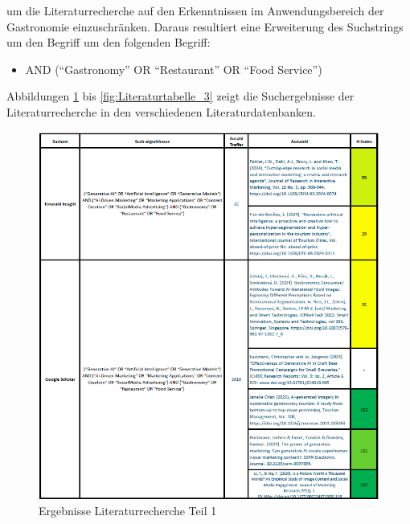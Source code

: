 um die Literaturrecherche auf den Erkenntnissen im Anwendungsbereich der Gastronomie einzuschränken.
Daraus resultiert eine Erweiterung des Suchstrings um den Begriff um den folgenden Begriff:

\begin{itemize}
    \item AND (``Gastronomy'' OR ``Restaurant'' OR ``Food Service'')
\end{itemize}

Abbildungen \ref{fig:Literaturtabelle_1} bis \ref{fig:Literaturtabelle_3} zeigt die Suchergebnisse der Literaturrecherche in den verschiedenen Literaturdatenbanken.

\begin{figure}[htbp]
    \centering
    \includegraphics[width=\textwidth]{abbildungen/Literaturtabelle_1}
    \caption{Ergebnisse Literaturrecherche Teil 1}
    \label{fig:Literaturtabelle_1}
\end{figure}

